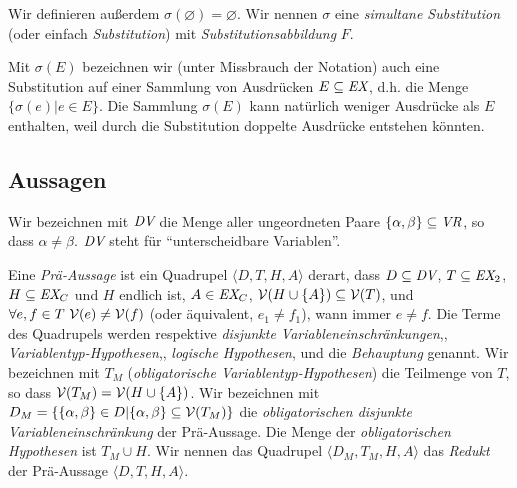 Wir definieren außerdem $\sigma(\varnothing)=\varnothing$.  Wir nennen $\sigma$ eine {\em simultane Substitution} (oder einfach {\em Substitution}) mit {\em Substitutionsabbildung} $F$. 

Mit $\sigma(E)$ bezeichnen wir (unter Missbrauch der Notation) auch eine Substitution auf einer Sammlung von Ausdrücken $E \subseteq \mbox{\em EX}$, d.h. die Menge $\{ \sigma(e) | e \in E \}$.  Die Sammlung $\sigma(E)$ kann natürlich weniger Ausdrücke als $E$ enthalten, weil durch die Substitution doppelte Ausdrücke entstehen könnten. 


\subsection{Aussagen}

Wir bezeichnen mit $\mbox{\em DV}$ die Menge aller ungeordneten Paare $\{\alpha, \beta \} \subseteq \mbox{\em VR}$, so dass $\alpha \neq \beta$. $\mbox{\em DV}$ steht für "`unterscheidbare Variablen"'. 

Eine {\em Prä-Aussage} ist ein Quadrupel $\langle D,T,H,A \rangle$ derart, dass $D\subseteq \mbox{\em DV}$, $T\subseteq \mbox{\em EX}_2$, $H\subseteq \mbox{\em EX}_C$ und $H$ endlich ist, $A\in \mbox{\em EX}_C$, ${\cal V}(H\cup\{A\}) \subseteq {\cal V}(T)$, und $\forall e,f\in T {\ } {\cal V}(e) \neq {\cal V}(f)$ (oder äquivalent, $e_1 \ne f_1$), wann immer $e \neq f$. Die Terme des Quadrupels werden respektive
{\em disjunkte Variableneinschränkungen},,
{\em Variablentyp-Hypothesen},,
{\em logische Hypothesen}, und die 
{\em Behauptung} genannt.
Wir bezeichnen mit $T_M$ ({\em obligatorische Variablentyp-Hypothesen}) die Teilmenge von $T$, so dass ${\cal V}(T_M) ={\cal V}(H \cup \{A\})$.  Wir bezeichnen mit $D_M=\{\{\alpha,\beta\}\in D|\{\alpha,\beta\}\subseteq {\cal V}(T_M)\}$ die {\em obligatorischen disjunkte Variableneinschränkung} der Prä-Aussage. Die Menge der {\em obligatorischen Hypothesen} ist $T_M\cup H$.  Wir nennen das Quadrupel $\langle D_M,T_M,H,A \rangle$ das {\em Redukt} der Prä-Aussage $\langle D,T,H,A \rangle$.  

